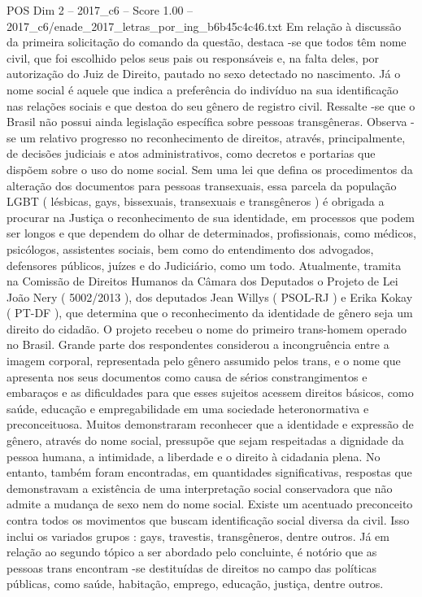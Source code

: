 \begin{textsample}{POS Dim 2 – 2017\_c6 – Score 1.00 – 2017\_c6/enade\_2017\_letras\_por\_ing\_b6b45c4c46.txt}
Em relação à discussão da primeira solicitação do comando da questão, destaca -se que todos têm nome civil, que foi escolhido pelos seus pais ou responsáveis e, na falta deles, por autorização do Juiz de Direito, pautado no sexo detectado no nascimento.
Já o nome social é aquele que indica a preferência do indivíduo na sua identificação nas relações sociais e que destoa do seu gênero de registro civil.
Ressalte -se que o Brasil não possui ainda legislação específica sobre pessoas transgêneras.
Observa -se um relativo progresso no reconhecimento de direitos, através, principalmente, de decisões judiciais e atos administrativos, como decretos e portarias que dispõem sobre o uso do nome social.
Sem uma lei que defina os procedimentos da alteração dos documentos para pessoas transexuais, essa parcela da população LGBT ( lésbicas, gays, bissexuais, transexuais e transgêneros ) é obrigada a procurar na Justiça o reconhecimento de sua identidade, em processos que podem ser longos e que dependem do olhar de determinados, profissionais, como médicos, psicólogos, assistentes sociais, bem como do entendimento dos advogados, defensores públicos, juízes e do Judiciário, como um todo.
Atualmente, tramita na Comissão de Direitos Humanos da Câmara dos Deputados o Projeto de Lei João Nery ( 5002/2013 ), dos deputados Jean Willys ( PSOL-RJ ) e Erika Kokay ( PT-DF ), que determina que o reconhecimento da identidade de gênero seja um direito do cidadão.
O projeto recebeu o nome do primeiro trans-homem operado no Brasil.
Grande parte dos respondentes considerou a incongruência entre a imagem corporal, representada pelo gênero assumido pelos trans, e o nome que apresenta nos seus documentos como causa de sérios constrangimentos e embaraços e as dificuldades para que esses sujeitos acessem direitos básicos, como saúde, educação e empregabilidade em uma sociedade heteronormativa e preconceituosa.
Muitos demonstraram reconhecer que a identidade e expressão de gênero, através do nome social, pressupõe que sejam respeitadas a dignidade da pessoa humana, a intimidade, a liberdade e o direito à cidadania plena.
No entanto, também foram encontradas, em quantidades significativas, respostas que demonstravam a existência de uma interpretação social conservadora que não admite a mudança de sexo nem do nome social.
Existe um acentuado preconceito contra todos os movimentos que buscam identificação social diversa da civil.
Isso inclui os variados grupos : gays, travestis, transgêneros, dentre outros.
Já em relação ao segundo tópico a ser abordado pelo concluinte, é notório que as pessoas trans encontram -se destituídas de direitos no campo das políticas públicas, como saúde, habitação, emprego, educação, justiça, dentre outros.

\end{textsample}
